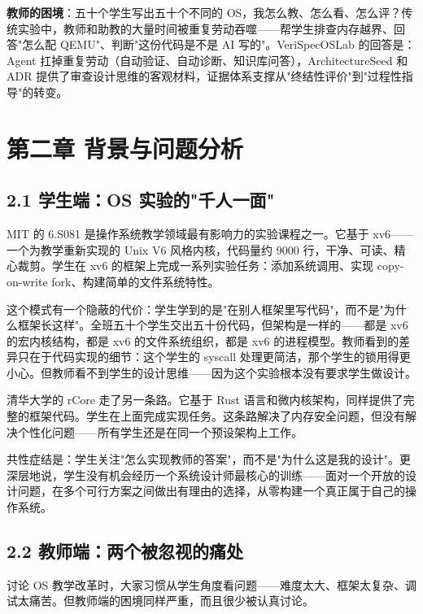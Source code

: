 \documentclass[UTF8,a4paper,12pt,openany]{ctexrep}
\begin{document}
\textbf{教师的困境}：五十个学生写出五十个不同的 OS，我怎么教、怎么看、怎么评？传统实验中，教师和助教的大量时间被重复劳动吞噬------帮学生排查内存越界、回答"怎么配 QEMU"、判断"这份代码是不是 AI 写的"。VeriSpecOSLab 的回答是：Agent 扛掉重复劳动（自动验证、自动诊断、知识库问答），ArchitectureSeed 和 ADR 提供了审查设计思维的客观材料，证据体系支撑从"终结性评价"到"过程性指导"的转变。


\chapter{第二章 背景与问题分析}\label{ux7b2cux4e8cux7ae0-ux80ccux666fux4e0eux95eeux9898ux5206ux6790}

\section{2.1 学生端：OS 实验的"千人一面"}\label{21-ux5b66ux751fux7aefos-ux5b9eux9a8cux7684ux5343ux4ebaux4e00ux9762}

MIT 的 6.S081 是操作系统教学领域最有影响力的实验课程之一。它基于 xv6------一个为教学重新实现的 Unix V6 风格内核，代码量约 9000 行，干净、可读、精心裁剪。学生在 xv6 的框架上完成一系列实验任务：添加系统调用、实现 copy-on-write fork、构建简单的文件系统特性。

这个模式有一个隐蔽的代价：学生学到的是"在别人框架里写代码"，而不是"为什么框架长这样"。全班五十个学生交出五十份代码，但架构是一样的------都是 xv6 的宏内核结构，都是 xv6 的文件系统组织，都是 xv6 的进程模型。教师看到的差异只在于代码实现的细节：这个学生的 syscall 处理更简洁，那个学生的锁用得更小心。但教师看不到学生的设计思维------因为这个实验根本没有要求学生做设计。

清华大学的 rCore 走了另一条路。它基于 Rust 语言和微内核架构，同样提供了完整的框架代码。学生在上面完成实现任务。这条路解决了内存安全问题，但没有解决个性化问题------所有学生还是在同一个预设架构上工作。

共性症结是：学生关注"怎么实现教师的答案"，而不是"为什么这是我的设计"。更深层地说，学生没有机会经历一个系统设计师最核心的训练------面对一个开放的设计问题，在多个可行方案之间做出有理由的选择，从零构建一个真正属于自己的操作系统。

\section{2.2 教师端：两个被忽视的痛处}\label{22-ux6559ux5e08ux7aefux4e24ux4e2aux88abux5ffdux89c6ux7684ux75dbux5904}

讨论 OS 教学改革时，大家习惯从学生角度看问题------难度太大、框架太复杂、调试太痛苦。但教师端的困境同样严重，而且很少被认真讨论。
\end{document}
